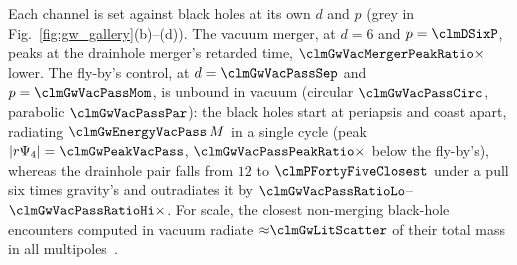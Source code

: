 \documentclass[twocolumn,floatfix,aps,prd,superscriptaddress,nofootinbib]{revtex4-2}
\begin{document}
Each channel is set against black holes at its own $d$ and $p$ (grey in Fig.~\ref{fig:gw_gallery}(b)--(d)). The vacuum merger, at $d=6$ and $p=\clmDSixP$, peaks at the drainhole merger's retarded time, $\clmGwVacMergerPeakRatio\times$ lower. The fly-by's control, at $d=\clmGwVacPassSep$ and $p=\clmGwVacPassMom$, is unbound in vacuum (circular $\clmGwVacPassCirc$, parabolic $\clmGwVacPassPar$): the black holes start at periapsis and coast apart, radiating $\clmGwEnergyVacPass\,M$ in a single cycle (peak $|r\Psi_4|=\clmGwPeakVacPass$, $\clmGwVacPassPeakRatio\times$ below the fly-by's), whereas the drainhole pair falls from $12$ to $\clmPFortyFiveClosest$ under a pull six times gravity's and outradiates it by $\clmGwVacPassRatioLo$--$\clmGwVacPassRatioHi\times$. For scale, the closest non-merging black-hole encounters computed in vacuum radiate ${\approx}\clmGwLitScatter$ of their total mass in all multipoles~\cite{damour2014}.
\end{document}
